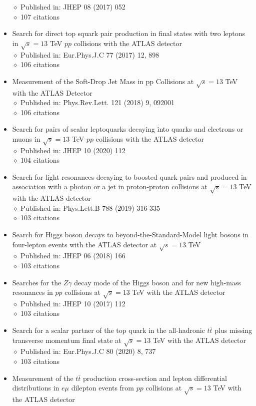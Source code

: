 \documentclass[margin, 10pt]{res} %
\begin{document}
\begin{resume}
\begin{itemize}
$\diamond$ Published in: JHEP 08 (2017) 052\\
$\diamond$ 107 citations
\item Search for direct top squark pair production in final states with two leptons in $\sqrt{s} = 13$ TeV $pp$ collisions with the ATLAS detector\\
$\diamond$ Published in: Eur.Phys.J.C 77 (2017) 12, 898\\
$\diamond$ 106 citations
\item Measurement of the Soft-Drop Jet Mass in pp Collisions at $\sqrt{s} = 13$ TeV with the ATLAS Detector\\
$\diamond$ Published in: Phys.Rev.Lett. 121 (2018) 9, 092001\\
$\diamond$ 106 citations
\item Search for pairs of scalar leptoquarks decaying into quarks and electrons or muons in $\sqrt{s} = 13$ TeV $pp$ collisions with the ATLAS detector\\
$\diamond$ Published in: JHEP 10 (2020) 112\\
$\diamond$ 104 citations
\item Search for light resonances decaying to boosted quark pairs and produced in association with a photon or a jet in proton-proton collisions at $\sqrt{s} = 13$ TeV with the ATLAS detector\\
$\diamond$ Published in: Phys.Lett.B 788 (2019) 316-335\\
$\diamond$ 103 citations
\item Search for Higgs boson decays to beyond-the-Standard-Model light bosons in four-lepton events with the ATLAS detector at $\sqrt{s} = 13$ TeV\\
$\diamond$ Published in: JHEP 06 (2018) 166\\
$\diamond$ 103 citations
\item Searches for the $Z \gamma$ decay mode of the Higgs boson and for new high-mass resonances in $pp$ collisions at $\sqrt{s} = 13$ TeV with the ATLAS detector\\
$\diamond$ Published in: JHEP 10 (2017) 112\\
$\diamond$ 103 citations
\item Search for a scalar partner of the top quark in the all-hadronic $t\bar{t}$ plus missing transverse momentum final state at $\sqrt{s} = 13$ TeV with the ATLAS detector\\
$\diamond$ Published in: Eur.Phys.J.C 80 (2020) 8, 737\\
$\diamond$ 103 citations
\item Measurement of the $t\bar{t}$ production cross-section and lepton differential distributions in $e\mu$ dilepton events from $pp$ collisions at $\sqrt{s} = 13$ TeV with the ATLAS detector\\

\end{itemize}
\end{resume}
\end{document}
